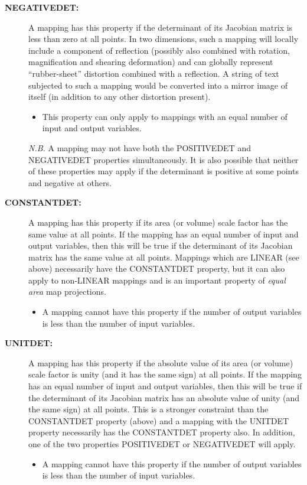 \documentclass[twoside,11pt]{article}
\renewcommand{\_}{\texttt{\symbol{95}}}
\newcommand{\name}[1]{\mbox{\small{#1}}}
\begin{document}
\begin{description}
\item[\textbf{NEGATIVE\_DET:}] A mapping has this property if the determinant
of its Jacobian matrix is less than zero at all points.
In two dimensions, such a mapping will locally include a component of
reflection (possibly also combined with rotation, magnification and shearing
deformation) and can globally represent ``rubber-sheet'' distortion
combined with a reflection.
A string of text subjected to such a mapping would be converted into a
mirror image of itself (in addition to any other distortion present).

\begin{itemize}
\item This property can only apply to mappings with an equal number of input
and output variables.
\end{itemize}

\emph{N.B.} A mapping may not have both the \name{POSITIVE\_DET} and
\name{NEGATIVE\_DET} properties simultaneously.
It is also possible that neither of these properties may apply if the
determinant is positive at some points and negative at others.

\item[\textbf{CONSTANT\_DET:}] A mapping has this property if its area (or
volume) scale factor has the same value at all points.
If the mapping has an equal number of input and output variables, then this
will be true if the determinant of its Jacobian matrix has the same value at
all points.
Mappings which are \name{LINEAR} (see above) necessarily have the
\name{CONSTANT\_DET} property, but it can also apply to non-\name{LINEAR}
mappings and is an important property of \emph{equal area} map projections.

\begin{itemize}
\item A mapping cannot have this property if the number of output variables
is less than the number of input variables.
\end{itemize}

\item[\textbf{UNIT\_DET:}]  A mapping has this property if the absolute value of
its area (or volume) scale factor is unity (and it has the same sign) at all
points.
If the mapping has an equal number of input and output variables, then this
will be true if the determinant of its Jacobian matrix has an absolute value
of unity (and the same sign) at all points.
This is a stronger constraint than the \name{CONSTANT\_DET} property (above)
and a mapping with the \name{UNIT\_DET} property necessarily has the
\name{CONSTANT\_DET} property also.
In addition, one of the two properties \name{POSITIVE\_DET} or
\name{NEGATIVE\_DET} will apply.

\begin{itemize}
\item A mapping cannot have this property if the number of output variables
is less than the number of input variables.
\end{itemize}

\end{description}
\end{document}
